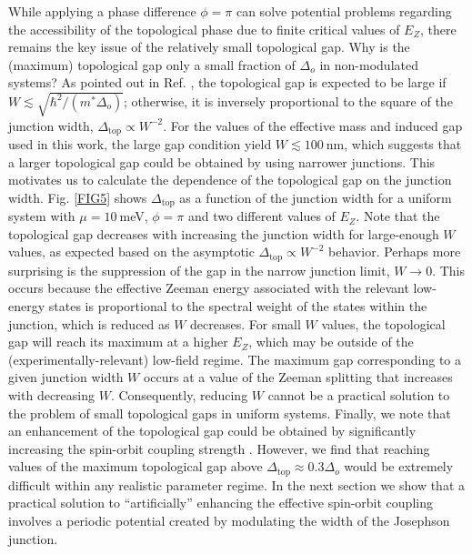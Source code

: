 \documentclass[twocolumn,aps,prb,nofootinbib]{revtex4-2}
\begin{document}
While applying a phase difference $\phi=\pi$ can solve potential problems regarding the accessibility of the topological phase due to finite critical values of $E_Z$, there remains the key issue of the relatively small topological gap. Why is the (maximum) topological gap only a small fraction of $\Delta_o$ in non-modulated systems? As pointed out in Ref. \cite{Pientka2017}, the topological gap is expected to be large if $W \lesssim \sqrt{\hbar^2/(m^* \Delta_o)}$;  otherwise, it is inversely proportional to the square of the junction width,  $\Delta_{\text{top}} \propto W^{-2}$. For the values of the effective mass and induced gap used in this work, the large gap condition yield $W \lesssim 100~\text{nm}$, which suggests that a larger topological gap could be obtained by using narrower junctions.
This motivates us to calculate the dependence of the topological gap on the junction width. Fig. \ref{FIG5} shows $\Delta_{\text{top}}$ as a function of the junction width for a uniform system with $\mu=10~$meV, $\phi=\pi$ and two different values of $E_Z$. Note that the topological gap decreases with increasing the junction width for large-enough $W$ values, as expected based on the asymptotic $\Delta_{\text{top}} \propto W^{-2}$ behavior. Perhaps more surprising is the suppression of the gap in the narrow junction limit, $W\rightarrow 0$. This occurs because the effective Zeeman energy associated with the relevant low-energy states is proportional to the spectral weight of the states within the junction, which is reduced as $W$ decreases. For small $W$ values, the topological gap will reach its maximum  at a higher  $E_Z$, which may be outside of the (experimentally-relevant) low-field regime. 
The maximum gap corresponding to a given junction width $W$ occurs at a value of the Zeeman splitting that increases with decreasing $W$. Consequently, 
reducing $W$ cannot be a practical solution to the problem of small topological gaps in uniform systems. Finally, we note that an enhancement of the topological gap could be obtained by significantly increasing the spin-orbit coupling strength \cite{Pientka2017}. However, we find that reaching values of the maximum topological gap above $\Delta_{\text{top}} \approx 0.3 \Delta_o$ would be extremely difficult within any realistic parameter regime. In the next section we show that a practical solution to ``artificially''  enhancing the effective spin-orbit coupling involves a periodic potential created by modulating the width of the Josephson junction.
\end{document}
